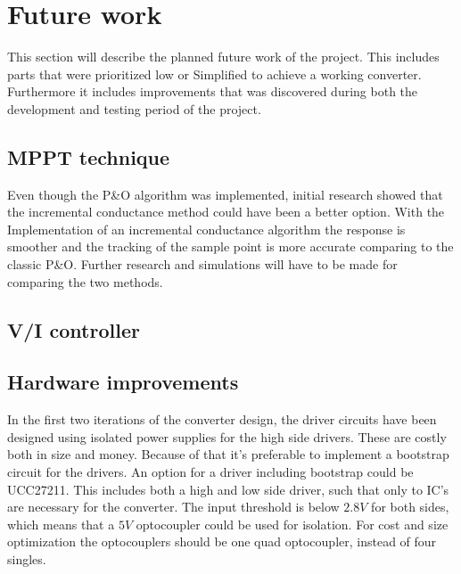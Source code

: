 \section{Future work}
This section will describe the planned future work of the project. This includes parts that were prioritized low or Simplified to achieve a working converter. Furthermore it includes improvements that was discovered during both the development and testing period of the project.


\subsection{MPPT technique}
Even though the P\&O algorithm was implemented, initial research showed that the incremental conductance method could have been a better option. With the Implementation of an incremental conductance algorithm the response is smoother and the tracking of the sample point is more accurate comparing to the classic P\&O.   Further research and simulations will have to be made for comparing the two methods. 


\subsection{V/I controller}

\subsection{Hardware improvements}
In the first two iterations of the converter design, the driver circuits have been designed using isolated power supplies for the high side drivers. These are costly both in size and money. Because of that it's preferable to implement a bootstrap circuit for the drivers. An option for a driver including bootstrap could be UCC27211\cite{boot_driver_datasheet}. This includes both a high and low side driver, such that only to IC's are necessary for the converter. The input threshold is below $2.8V$ for both sides, which means that a $5V$ optocoupler could be used for isolation. For cost and size optimization the optocouplers should be one quad optocoupler, instead of four singles. 
 
